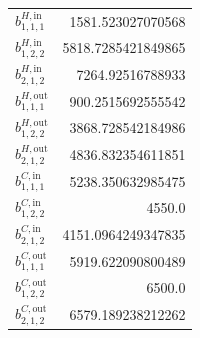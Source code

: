 \documentclass{article}%
\begin{document}
\begin{multicols*}{3}
\begin{supertabular}{lr}
	$b_{1,1,1}^{H,\text{in}}$ & 1581.523027070568 \\%
	$b_{1,2,2}^{H,\text{in}}$ & 5818.7285421849865 \\%
	$b_{2,1,2}^{H,\text{in}}$ & 7264.92516788933 \\%
	$b_{1,1,1}^{H,\text{out}}$ & 900.2515692555542 \\%
	$b_{1,2,2}^{H,\text{out}}$ & 3868.728542184986 \\%
	$b_{2,1,2}^{H,\text{out}}$ & 4836.832354611851 \\%
	$b_{1,1,1}^{C,\text{in}}$ & 5238.350632985475 \\%
	$b_{1,2,2}^{C,\text{in}}$ & 4550.0 \\%
	$b_{2,1,2}^{C,\text{in}}$ & 4151.0964249347835 \\%
	$b_{1,1,1}^{C,\text{out}}$ & 5919.622090800489 \\%
	$b_{1,2,2}^{C,\text{out}}$ & 6500.0 \\%
	$b_{2,1,2}^{C,\text{out}}$ & 6579.189238212262 \\%
\end{supertabular}%
\end{multicols*}%
\clearpage%
\end{document}
